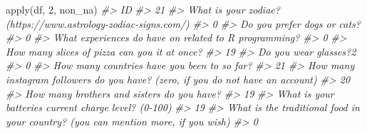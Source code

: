 \documentclass[
]{article}
\newenvironment{Shaded}{\begin{snugshade}}{\end{snugshade}}
\newcommand{\CommentTok}[1]{\textcolor[rgb]{0.56,0.35,0.01}{\textit{#1}}}
\newcommand{\DecValTok}[1]{\textcolor[rgb]{0.00,0.00,0.81}{#1}}
\newcommand{\FunctionTok}[1]{\textcolor[rgb]{0.00,0.00,0.00}{#1}}
\newcommand{\NormalTok}[1]{#1}
\begin{document}
\begin{Shaded}
\begin{Highlighting}[]
\FunctionTok{apply}\NormalTok{(df, }\DecValTok{2}\NormalTok{, non\_na)}
\CommentTok{\#\textgreater{}                                                                                ID }
\CommentTok{\#\textgreater{}                                                                                21 }
\CommentTok{\#\textgreater{}                    What is your zodiac? (https://www.astrology{-}zodiac{-}signs.com/) }
\CommentTok{\#\textgreater{}                                                                                 0 }
\CommentTok{\#\textgreater{}                                                       Do you prefer dogs or cats? }
\CommentTok{\#\textgreater{}                                                                                 0 }
\CommentTok{\#\textgreater{}                             What experiences do have on related to R programming? }
\CommentTok{\#\textgreater{}                                                                                 0 }
\CommentTok{\#\textgreater{}                                      How many slices of pizza can you it at once? }
\CommentTok{\#\textgreater{}                                                                                19 }
\CommentTok{\#\textgreater{}                                                             Do you wear glasses?2 }
\CommentTok{\#\textgreater{}                                                                                 0 }
\CommentTok{\#\textgreater{}                                       How many countries have you been to so far? }
\CommentTok{\#\textgreater{}                                                                                21 }
\CommentTok{\#\textgreater{}   How many instagram followers do you have? (zero, if you do not have an account) }
\CommentTok{\#\textgreater{}                                                                                20 }
\CommentTok{\#\textgreater{}                                        How many brothers and sisters do you have? }
\CommentTok{\#\textgreater{}                                                                                19 }
\CommentTok{\#\textgreater{}                              What is your batteries current charge level? (0{-}100) }
\CommentTok{\#\textgreater{}                                                                                19 }
\CommentTok{\#\textgreater{} What is the traditional food in your country? (you can mention more, if you wish) }
\CommentTok{\#\textgreater{}                                                                                 0}
\end{Highlighting}
\end{Shaded}
\end{document}
